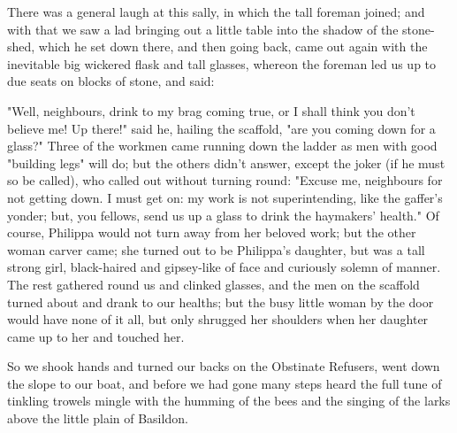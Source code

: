 There was a general laugh at this sally, in which the tall foreman
joined; and with that we saw a lad bringing out a little table into the
shadow of the stone-shed, which he set down there, and then going back,
came out again with the inevitable big wickered flask and tall glasses,
whereon the foreman led us up to due seats on blocks of stone, and said:

"Well, neighbours, drink to my brag coming true, or I shall think you
don't believe me! Up there!" said he, hailing the scaffold, "are you
coming down for a glass?" Three of the workmen came running down the
ladder as men with good "building legs" will do; but the others didn't
answer, except the joker (if he must so be called), who called out
without turning round: "Excuse me, neighbours for not getting down. I
must get on: my work is not superintending, like the gaffer's yonder;
but, you fellows, send us up a glass to drink the haymakers' health." Of
course, Philippa would not turn away from her beloved work; but the
other woman carver came; she turned out to be Philippa's daughter, but
was a tall strong girl, black-haired and gipsey-like of face and
curiously solemn of manner. The rest gathered round us and clinked
glasses, and the men on the scaffold turned about and drank to our
healths; but the busy little woman by the door would have none of it
all, but only shrugged her shoulders when her daughter came up to her
and touched her.

So we shook hands and turned our backs on the Obstinate Refusers, went
down the slope to our boat, and before we had gone many steps heard the
full tune of tinkling trowels mingle with the humming of the bees and
the singing of the larks above the little plain of Basildon.
